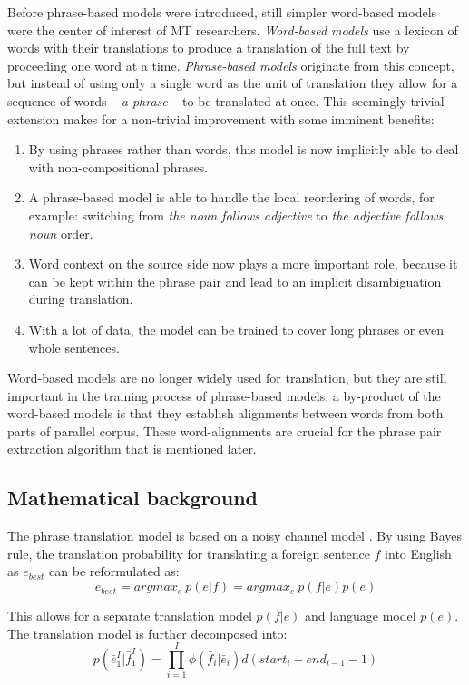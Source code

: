 Before phrase-based models were introduced, still simpler word-based models were
the center of interest of MT researchers.
\emph{Word-based models} use a lexicon of words with their translations to produce
a translation of the full text by proceeding one word at a time.
\emph{Phrase-based models} originate from this concept, but instead of using only
a single word as the unit of translation they allow for a sequence of words -- \emph{a phrase}
-- to be translated at once.
This seemingly trivial extension makes for a non-trivial improvement with some
imminent benefits:
\begin{enumerate}
  \item By using phrases rather than words, this model is now implicitly able to deal
    with non-compositional phrases.
  \item A phrase-based model is able to handle the local reordering of words, for example:
    switching from \emph{the noun follows adjective} to \emph{the adjective follows noun} order.
  \item Word context on the source side now plays a more important role, because it can be kept
    within the phrase pair and lead to an implicit disambiguation during translation.
  \item With a lot of data, the model can be trained to cover long phrases or even
    whole sentences.
\end{enumerate}

Word-based models are no longer widely used for translation, but they are still important
in the training process of phrase-based models: a by-product of the word-based models
is that they establish alignments between words from both parts of parallel corpus.
These word-alignments are crucial for the phrase pair extraction algorithm that is mentioned
later.

\subsection{Mathematical background}

The phrase translation model is based on a noisy channel model \citep{koehn:spbt}.
By using Bayes rule, the translation probability for translating a foreign sentence $f$
into English as $e_{best}$ can be reformulated as:
\begin{equation}
  e_{best} = argmax_{e}~p(e|f) =  argmax_{e}~p(f|e)p(e)
\end{equation}

This allows for a separate translation model $p(f|e)$ and language model $p(e)$.
The translation model is further decomposed into:
\begin{equation} \label{eq:tm}
  p(\bar{e}_1^I|\bar{f}_1^I) = \prod_{i=1}^I \phi(\bar{f}_i|\bar{e}_i) d(start_i - end_{i-1} - 1)
\end{equation}

